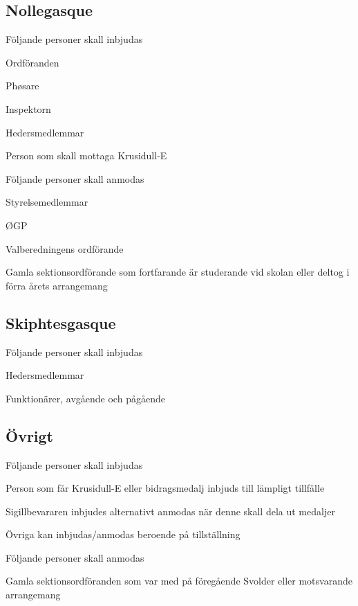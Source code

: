 \documentclass[../_main/handlingar.tex]{subfiles}
\begin{document}
\subsection*{Nollegasque}
Följande personer skall inbjudas
\begin{dashlist}
\item Ordföranden
\item Phøsare
\item Inspektorn
\item Hedersmedlemmar
\item Person som skall mottaga Krusidull-E
\end{dashlist}
Följande personer skall anmodas
\begin{dashlist}
\item Styrelsemedlemmar
\item ØGP
\item Valberedningens ordförande
\item Gamla sektionsordförande som fortfarande är studerande vid skolan
eller deltog i förra årets
arrangemang
\end{dashlist}

\subsection*{Skiphtesgasque}
Följande personer skall inbjudas
\begin{dashlist}
\item Hedersmedlemmar
\item Funktionärer, avgående och pågående
\end{dashlist}

\subsection*{Övrigt}
Följande personer skall inbjudas
\begin{dashlist}
\item Person som får Krusidull-E eller bidragsmedalj inbjuds till lämpligt tillfälle
\item Sigillbevararen inbjudes alternativt anmodas när denne skall dela ut
medaljer
\item Övriga kan inbjudas/anmodas beroende på tillställning
\end{dashlist}
Följande personer skall anmodas
\begin{dashlist}
\item Gamla sektionsordföranden som var med på föregående Svolder eller
motsvarande arrangemang
\end{dashlist}
\end{document}
